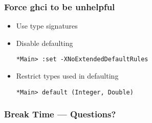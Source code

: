 \documentclass{beamer}
\begin{document}
\begin{frame}[fragile]
  \frametitle{Force ghci to be unhelpful}
  \begin{itemize}
  \item Use type signatures
  \item Disable defaulting
\begin{verbatim}
*Main> :set -XNoExtendedDefaultRules
\end{verbatim}
  \item Restrict types used in defaulting
\begin{verbatim}
*Main> default (Integer, Double)
\end{verbatim}
  \end{itemize}
\end{frame}

\begin{frame}
  \frametitle{Break Time --- Questions?}
  \begin{center}
  \end{center}
\end{frame}
\end{document}
